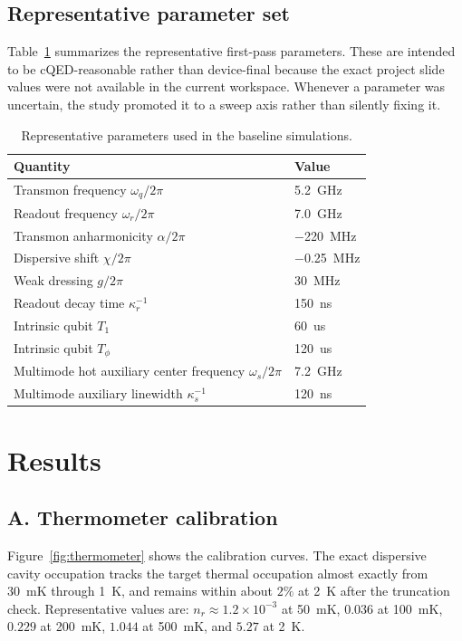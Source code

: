 \documentclass[11pt]{article}
\begin{document}
\subsection{Representative parameter set}
Table~\ref{tab:params} summarizes the representative first-pass parameters. These are intended to be cQED-reasonable rather than device-final because the exact project slide values were not available in the current workspace. Whenever a parameter was uncertain, the study promoted it to a sweep axis rather than silently fixing it.

\begin{table}[h]
\centering
\caption{Representative parameters used in the baseline simulations.}
\label{tab:params}
\begin{tabular}{ll}
\toprule
Quantity & Value \\
\midrule
Transmon frequency \(\omega_q/2\pi\) & \SI{5.2}{GHz} \\
Readout frequency \(\omega_r/2\pi\) & \SI{7.0}{GHz} \\
Transmon anharmonicity \(\alpha/2\pi\) & \SI{-220}{MHz} \\
Dispersive shift \(\chi/2\pi\) & \SI{-0.25}{MHz} \\
Weak dressing \(g/2\pi\) & \SI{30}{MHz} \\
Readout decay time \(\kappa_r^{-1}\) & \SI{150}{ns} \\
Intrinsic qubit \(T_1\) & \SI{60}{us} \\
Intrinsic qubit \(T_\phi\) & \SI{120}{us} \\
Multimode hot auxiliary center frequency \(\omega_s/2\pi\) & \SI{7.2}{GHz} \\
Multimode auxiliary linewidth \(\kappa_s^{-1}\) & \SI{120}{ns} \\
\bottomrule
\end{tabular}
\end{table}

\section{Results}
\subsection{A. Thermometer calibration}
Figure~\ref{fig:thermometer} shows the calibration curves. The exact dispersive cavity occupation tracks the target thermal occupation almost exactly from \SI{30}{mK} through \SI{1}{K}, and remains within about \(2\%\) at \SI{2}{K} after the truncation check. Representative values are: \(n_r \approx 1.2\times 10^{-3}\) at \SI{50}{mK}, \(0.036\) at \SI{100}{mK}, \(0.229\) at \SI{200}{mK}, \(1.044\) at \SI{500}{mK}, and \(5.27\) at \SI{2}{K}.
\end{document}
